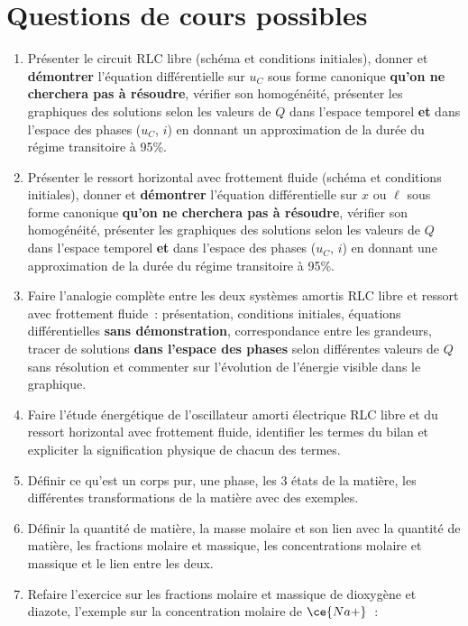\documentclass[a4paper, 12pt, final, garamond]{book}
\begin{document}
\section{Questions de cours possibles}
\begin{enumerate}
    \item Présenter le circuit RLC libre (schéma et conditions initiales),
        donner et \textbf{démontrer} l'équation différentielle sur $u_C$ sous
        forme canonique \textbf{qu'on ne cherchera pas à résoudre}, vérifier son
        homogénéité, présenter les graphiques des solutions selon les valeurs de
        $Q$ dans l'espace temporel \textbf{et} dans l'espace des phases ($u_C$,
        $i$) en donnant un approximation de la durée du régime transitoire à
        95\%.
    \item Présenter le ressort horizontal avec frottement fluide (schéma et
        conditions initiales), donner et \textbf{démontrer} l'équation
        différentielle sur $x$ ou $\ell$ sous forme canonique \textbf{qu'on ne
        cherchera pas à résoudre}, vérifier son homogénéité, présenter les
        graphiques des solutions selon les valeurs de $Q$ dans l'espace temporel
        \textbf{et} dans l'espace des phases ($u_C$, $i$) en donnant une
        approximation de la durée du régime transitoire à 95\%.

    \item Faire l'analogie complète entre les deux systèmes amortis RLC libre et
        ressort avec frottement fluide~: présentation, conditions initiales,
        équations différentielles \textbf{sans démonstration}, correspondance
        entre les grandeurs, tracer de solutions \textbf{dans l'espace des
        phases} selon différentes valeurs de $Q$ sans résolution et commenter
        sur l'évolution de l'énergie visible dans le graphique.

    \item Faire l'étude énergétique de l'oscillateur amorti électrique RLC libre
        et du ressort horizontal avec frottement fluide, identifier les termes
        du bilan et expliciter la signification physique de chacun des termes.

    \item Définir ce qu'est un corps pur, une phase, les 3 états de la matière,
        les différentes transformations de la matière avec des exemples.

    \item Définir la quantité de matière, la masse molaire et son lien avec la
        quantité de matière, les fractions molaire et massique, les
        concentrations molaire et massique et le lien entre les deux.

    \item Refaire l'exercice sur les fractions molaire et massique de dioxygène
        et diazote, l'exemple sur la concentration molaire de $\ce{Na+}$~:
\end{enumerate}
\end{document}
